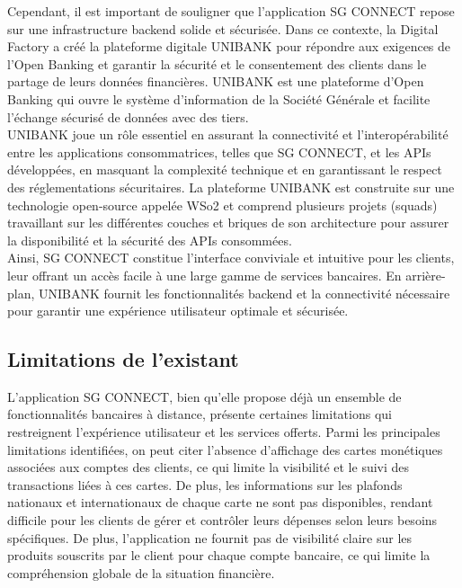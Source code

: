 Cependant, il est important de souligner que l'application SG CONNECT repose sur une infrastructure backend solide et sécurisée. Dans ce contexte, la Digital Factory a créé la plateforme digitale UNIBANK pour répondre aux exigences de l'Open Banking et garantir la sécurité et le consentement des clients dans le partage de leurs données financières. UNIBANK est une plateforme d'Open Banking qui ouvre le système d'information de la Société Générale et facilite l'échange sécurisé de données avec des tiers.\\

UNIBANK joue un rôle essentiel en assurant la connectivité et l'interopérabilité entre les applications consommatrices, telles que SG CONNECT, et les APIs développées, en masquant la complexité technique et en garantissant le respect des réglementations sécuritaires. La plateforme UNIBANK est construite sur une technologie open-source appelée WSo2 et comprend plusieurs projets (squads) travaillant sur les différentes couches et briques de son architecture pour assurer la disponibilité et la sécurité des APIs consommées.\\

Ainsi, SG CONNECT constitue l'interface conviviale et intuitive pour les clients, leur offrant un accès facile à une large gamme de services bancaires. En arrière-plan, UNIBANK fournit les fonctionnalités backend et la connectivité nécessaire pour garantir une expérience utilisateur optimale et sécurisée.

\subsection{Limitations de l'existant}
L'application SG CONNECT, bien qu'elle propose déjà un ensemble de fonctionnalités bancaires à distance, présente certaines limitations qui restreignent l'expérience utilisateur et les services offerts. Parmi les principales limitations identifiées, on peut citer l'absence d'affichage des cartes monétiques associées aux comptes des clients, ce qui limite la visibilité et le suivi des transactions liées à ces cartes. De plus, les informations sur les plafonds nationaux et internationaux de chaque carte ne sont pas disponibles, rendant difficile pour les clients de gérer et contrôler leurs dépenses selon leurs besoins spécifiques. De plus, l'application ne fournit pas de visibilité claire sur les produits souscrits par le client pour chaque compte bancaire, ce qui limite la compréhension globale de la situation financière.\\

